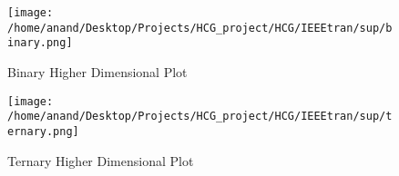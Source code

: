 \documentclass[10pt,final,1p,times,twocolumn]{elsarticle}
\begin{document}
\begin{figure*}
  \texttt{[image: /home/anand/Desktop/Projects/HCG\_project/HCG/IEEEtran/sup/binary.png]}
  \caption{Binary Higher Dimensional Plot}
\end{figure*}
\begin{figure*}
  \texttt{[image: /home/anand/Desktop/Projects/HCG\_project/HCG/IEEEtran/sup/ternary.png]}
  \caption{Ternary Higher Dimensional Plot}
\end{figure*}








\end{document}
